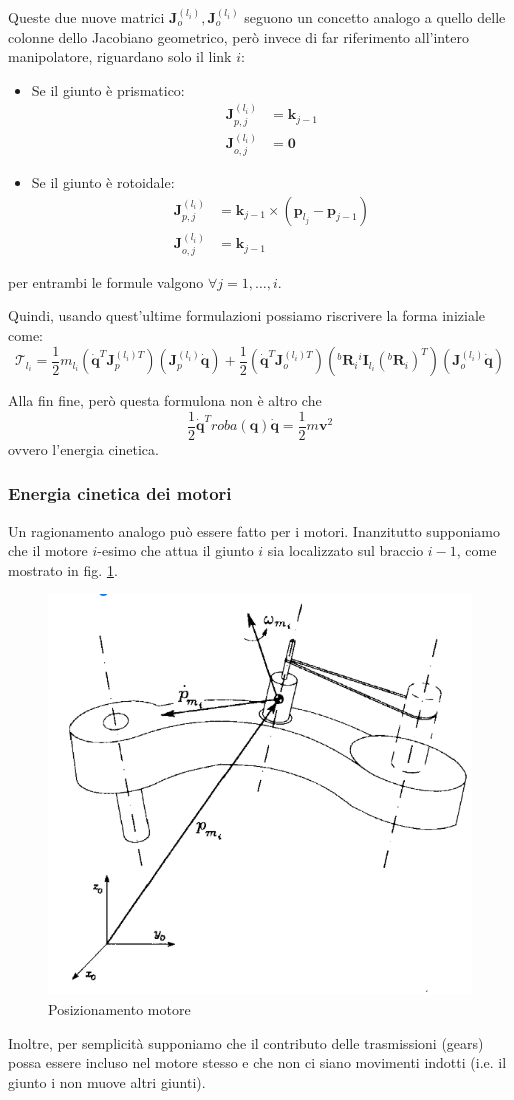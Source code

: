 Queste due nuove matrici $\bm{J}^{(l_i)}_{o}, \bm{J}^{(l_i)}_{o}$ seguono un concetto analogo a quello delle colonne dello Jacobiano geometrico, però invece di far riferimento all'intero manipolatore, riguardano solo il link $i$:
\begin{itemize}
	\item Se il giunto è prismatico:
	\begin{align*}
		\bm{J}^{(l_i)}_{p,j} &= \bm{k}_{j-1} \\
		\bm{J}^{(l_i)}_{o,j} &= \bm{0}
	\end{align*}
	\item Se il giunto è rotoidale:
	\begin{align*}
		\bm{J}^{(l_i)}_{p,j} &= \bm{k}_{j-1} \times (\bm{p}_{l_j} - \bm{p}_{j-1} ) \\
		\bm{J}^{(l_i)}_{o,j} &= \bm{k}_{j-1}
	\end{align*}
\end{itemize}
per entrambi le formule valgono $\forall j = 1,\dots,i$.

Quindi, usando quest'ultime formulazioni possiamo riscrivere la forma iniziale come:
$$
\mathcal{T}_{l_i}
=
\frac{1}{2} m_{l_i} \left(\bm{\dot{q}}^T \bm{J}_p^{(l_i)T}\right) \left(\bm{J}_p^{(l_i)} \bm{\dot{q}}\right)
+
\frac{1}{2} 
\left(\bm{\dot{q}}^T \bm{J}_o^{(l_i)T}\right)
\left( {}^b\bm{R}_i {}^i\bm{I}_{l_i} ({}^b\bm{R}_i)^T \right)
\left(\bm{J}_o^{(l_i)} \bm{\dot{q}}\right)
$$

Alla fin fine, però questa formulona non è altro che 
$$
\frac{1}{2} \bm{\dot{q}}^T \textit{roba}(\bm{q}) \bm{\dot{q}}
=
\frac{1}{2}m\bm{v}^2
$$
ovvero l'energia cinetica.




\subsubsection{Energia cinetica dei motori}

Un ragionamento analogo può essere fatto per i motori. Inanzitutto supponiamo che il motore $i$-esimo che attua il giunto $i$ sia localizzato sul braccio $i-1$, come mostrato in fig. \ref{fig:dynamics1}.
\begin{figure}[H]
	\centering
	\includegraphics[width=0.3\linewidth]{images/dynamics_1}
	\caption{Posizionamento motore}
	\label{fig:dynamics1}
\end{figure}
Inoltre, per semplicità supponiamo che il contributo delle trasmissioni (gears) possa essere incluso nel motore stesso e che non ci siano movimenti indotti (i.e. il giunto i non muove altri giunti).


